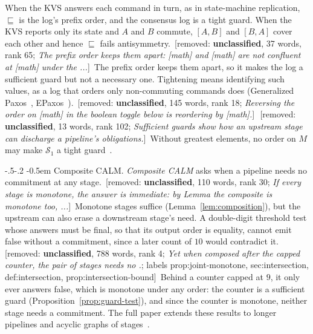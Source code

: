 \documentclass[sigconf]{cidr-2027}
\makeatletter
\theoremstyle{remark}
\renewcommand\paragraph{\@startsection{paragraph}{4}{\z@}%
  {-.5\baselineskip \@plus -2\p@ \@minus -.2\p@}%
  {-0.5em}%
  {\normalfont\bfseries}}
\newcommand{\commitment}{commitment\xspace}
\newcommand{\Spec}{\mathcal{S}}
\newif\ifshowrv \showrvfalse
\newcommand{\rv}[1]{\ifshowrv\textsuperscript{\textcolor{magenta}{\textbf{R#1}}}\fi}
\newcommand{\removednote}[1]{{\color{cutred}\footnotesize\,[removed: #1]\,}}
\makeatother
\begin{document}
\textcolor{newblue}{When the KVS answers each command in turn, as in state-machine replication,
$\sqsubseteq$ is the log's prefix order, and the consensus log is a tight guard.} \textcolor{newblue}{When the KVS reports only its state and $A$ and $B$ commute, $[A,B]$ and
$[B,A]$ cover each other and hence $\sqsubseteq$ fails antisymmetry.} \removednote{\textbf{unclassified}, 37 words, rank 65; \textit{The prefix order keeps them apart: [math] and [math] are not confluent at [math] under the ...}} \textcolor{newblue}{The prefix order keeps them
apart, so it makes the log a sufficient guard but not a necessary one.} \textcolor{newblue}{Tightening means identifying such values, as a log that orders only
non-commuting commands does (Generalized Paxos~\cite{lamport2005generalized},
EPaxos~\cite{moraru2013epaxos}).} \removednote{\textbf{unclassified}, 145 words, rank 18; \textit{Reversing the order on [math] in the boolean toggle below is reordering by [math].}} \removednote{\textbf{unclassified}, 13 words, rank 102; \textit{Sufficient guards show how an upstream stage can discharge a pipeline's obligations.}} \textcolor{newblue}{Without greatest elements, no order on $M$
may make $\Spec_1$ a tight guard~\cite{hellerstein2026completecalmfull}.\rv{2}}

\paragraph{Composite CALM.}
\label{sec:composite-calm}
\textcolor{newblue}{\emph{Composite CALM} asks when a pipeline needs no \commitment at any stage.} \removednote{\textbf{unclassified}, 110 words, rank 30; \textit{If every stage is monotone, the answer is immediate: by Lemma the composite is monotone too, ...}} \textcolor{newblue}{Monotone stages suffice (Lemma~\ref{lem:composition}), but the upstream can
also erase a downstream stage's need.} \textcolor{newblue}{A double-digit threshold test whose
answers must be final, so that its output order is equality, cannot emit
\textsf{false} without a \commitment, since a later count of $10$ would
contradict it.} \removednote{\textbf{unclassified}, 788 words, rank 4; \textit{Yet when composed after the capped counter, the pair of stages needs no .}; labels prop:joint-monotone, sec:intersection, def:intersection, prop:intersection-bound} \textcolor{newblue}{Behind a counter capped at $9$, it only ever answers
\textsf{false}, which is monotone under any order: the counter is a sufficient guard
(Proposition~\ref{prop:guard-test}), and since the counter is monotone,
neither stage needs a \commitment.} \textcolor{newblue}{The full paper extends these results to
longer pipelines and acyclic graphs of stages~\cite{hellerstein2026completecalmfull}.\rv{2}}
\end{document}
